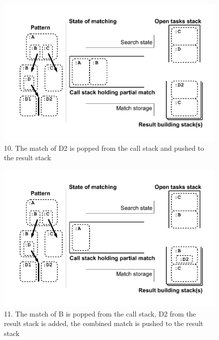 \begin{figure}[htbp]
  \centering
  \includegraphics[width=\textwidth]{fig/Passungszustand10}
  \caption{10. The match of D2 is popped from the call stack and pushed to the result stack}
  \label{figmatchingstate10}
\end{figure}

\begin{figure}[htbp]
  \centering
  \includegraphics[width=\textwidth]{fig/Passungszustand11}
  \caption{11. The match of B is popped from the call stack, D2 from the result stack is added, the combined match is pushed to the result stack}
  \label{figmatchingstate11}
\end{figure}


